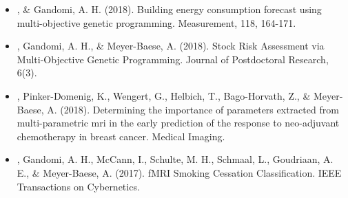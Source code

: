 \documentclass[]{template}
\begin{document}
\begin{itemize}
\item {}, \& Gandomi, A. H. (2018). Building energy consumption forecast using multi-objective genetic programming. Measurement, 118, 164-171.


\item {}, Gandomi, A. H., \& Meyer-Baese, A. (2018). Stock Risk Assessment via Multi-Objective Genetic Programming. Journal of Postdoctoral Research, 6(3).


\item {}, Pinker-Domenig, K., Wengert, G., Helbich, T., Bago-Horvath, Z., \& Meyer-Baese, A. (2018). Determining the importance of parameters extracted from multi-parametric mri in the early prediction of the response to neo-adjuvant chemotherapy in breast cancer. Medical Imaging.

\item {}, Gandomi, A. H., McCann, I., Schulte, M. H., Schmaal, L., Goudriaan, A. E., \& Meyer-Baese, A. (2017). fMRI Smoking Cessation Classification. IEEE Transactions on Cybernetics.


\end{itemize}
\sectionsep 
\end{document}
